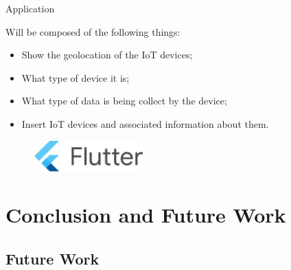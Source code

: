 \documentclass[xcolor={svgnames},aspectratio=169]{beamer}
\begin{document}
\begin{frame}{Application}
    \begin{multicols}{2}
        Will be composed of the following things:
        \begin{itemize}
            \item Show the geolocation of the IoT devices;
            \item What type of device it is;
            \item What type of data is being collect by the device;
            \item Insert IoT devices and associated information about them.
        \end{itemize}

        \columnbreak
        \begin{figure}
            \centering\includegraphics[width=120pt]{assets/images/flutter.png}
        \end{figure}
    \end{multicols}
\end{frame}

\section{Conclusion and Future Work}

\subsection{Future Work}
\end{document}

